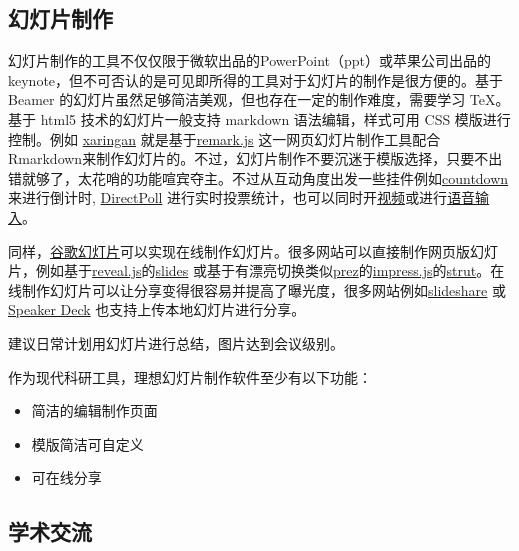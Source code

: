 \documentclass[]{tufte-book}
\providecommand{\tightlist}{%
  \setlength{\itemsep}{0pt}\setlength{\parskip}{0pt}}
\begin{document}
\hypertarget{ux5e7bux706fux7247ux5236ux4f5c}{%
\subsection*{幻灯片制作}\label{ux5e7bux706fux7247ux5236ux4f5c}}

幻灯片制作的工具不仅仅限于微软出品的PowerPoint（ppt）或苹果公司出品的 keynote，但不可否认的是可见即所得的工具对于幻灯片的制作是很方便的。基于 Beamer 的幻灯片虽然足够简洁美观，但也存在一定的制作难度，需要学习 TeX。基于 html5 技术的幻灯片一般支持 markdown 语法编辑，样式可用 CSS 模版进行控制。例如 \href{https://github.com/yihui/xaringan}{xaringan} 就是基于\href{https://remarkjs.com}{remark.js} 这一网页幻灯片制作工具配合Rmarkdown来制作幻灯片的。不过，幻灯片制作不要沉迷于模版选择，只要不出错就够了，太花哨的功能喧宾夺主。不过从互动角度出发一些挂件例如\href{https://pkg.garrickadenbuie.com/countdown}{countdown} 来进行倒计时, \href{https://directpoll.com}{DirectPoll} 进行实时投票统计，也可以同时开\href{https://yihui.name/en/2017/12/html5-camera/}{视频}或进行\href{https://yihui.shinyapps.io/voice/}{语音输入}。

同样，\href{https://www.google.com/intl/zh-CN_us/slides/about/}{谷歌幻灯片}可以实现在线制作幻灯片。很多网站可以直接制作网页版幻灯片，例如基于\href{https://revealjs.com}{reveal.js}的\href{https://slides.com/}{slides} 或基于有漂亮切换类似\href{https://prezi.com/}{prez}的\href{https://impress.js.org/\#/source}{impress.js}的\href{http://strut.io}{strut}。在线制作幻灯片可以让分享变得很容易并提高了曝光度，很多网站例如\href{https://www.slideshare.net/}{slideshare} 或 \href{https://speakerdeck.com/}{Speaker Deck} 也支持上传本地幻灯片进行分享。

建议日常计划用幻灯片进行总结，图片达到会议级别。

作为现代科研工具，理想幻灯片制作软件至少有以下功能：

\begin{itemize}
\tightlist
\item
  简洁的编辑制作页面
\item
  模版简洁可自定义
\item
  可在线分享
\end{itemize}

\hypertarget{ux5b66ux672fux4ea4ux6d41}{%
\subsection*{学术交流}\label{ux5b66ux672fux4ea4ux6d41}}
\end{document}
